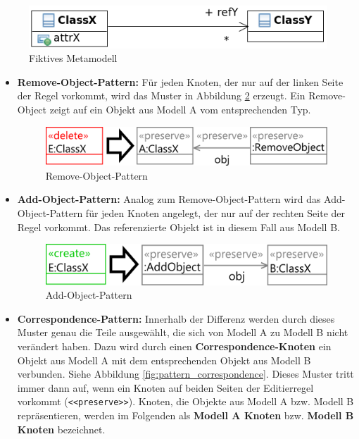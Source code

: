 \begin{figure}[htbp]
  \centering
  \includegraphics[scale=0.65]{images/fiktiv_metamodel.png}
  \caption{Fiktives Metamodell}
  \label{fiktiv_metamodel}
\end{figure}

\begin{itemize}
  \item \textbf{Remove-Object-Pattern:} Für jeden Knoten, der nur auf der linken Seite der Regel
  vorkommt, wird das Muster in Abbildung \ref{pattern_remove_object} erzeugt. Ein Remove-Object
  zeigt auf ein Objekt aus Modell A vom entsprechenden Typ.
  
  \begin{figure}[htbp]
    \centering
    \includegraphics[scale=0.8]{images/pattern_remove_object.png}
    \caption{Remove-Object-Pattern}
    \label{pattern_remove_object}
  \end{figure}
  
  \item  \textbf{Add-Object-Pattern:} Analog zum Remove-Object-Pattern wird das Add-Object-Pattern
  für jeden Knoten angelegt, der nur auf der rechten Seite der Regel vorkommt. Das referenzierte
  Objekt ist in diesem Fall aus Modell B.
  
  \begin{figure}[htbp]
    \centering
    \includegraphics[scale=0.8]{images/pattern_add_object.png}
    \caption{Add-Object-Pattern}
  \end{figure}
  
  \item \textbf{Correspondence-Pattern:} Innerhalb der Differenz werden durch dieses Muster genau
  die Teile ausgewählt, die sich von Modell A zu Modell B nicht verändert haben. Dazu wird durch
  einen \textbf{Correspondence-Knoten} ein Objekt aus Modell A mit dem entsprechenden Objekt aus
  Modell B verbunden. Siehe Abbildung \ref{fig:pattern_correspondence}. Dieses Muster tritt immer
  dann auf,  wenn ein Knoten auf beiden Seiten der Editierregel vorkommt (\texttt{<<preserve>>}).
  Knoten, die Objekte aus Modell A bzw. Modell B repräsentieren, werden im Folgenden als
  \textbf{Modell A Knoten} bzw. \textbf{Modell B Knoten} bezeichnet.
  

\end{itemize}
